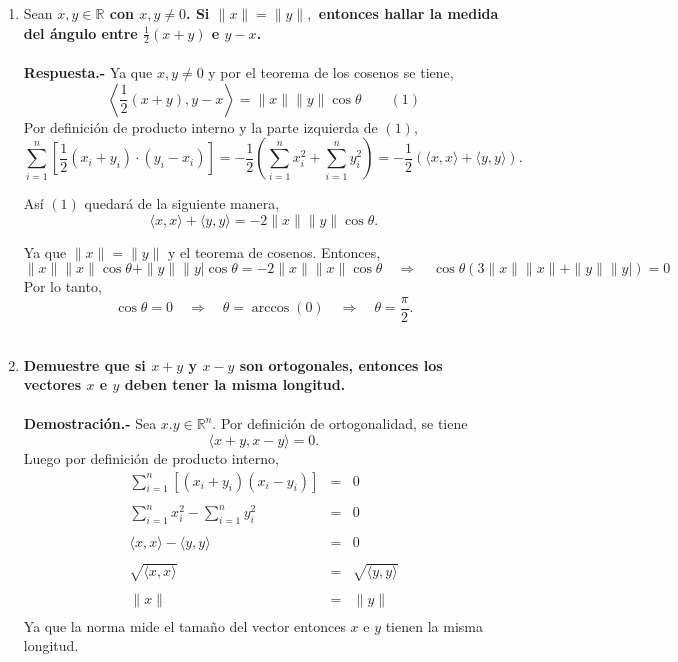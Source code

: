 \begin{enumerate}

    \item Sean \textbf{\boldmath $x,y \in \mathbb{R}$ con $x,y\neq 0$. Si $\|x\|=\|y\|,$ entonces hallar la medida del ángulo entre $\frac{1}{2}(x+y)$ e $y-x$.\\\\
	Respuesta.-}\; Ya que $x,y\neq 0$ y por el teorema de los cosenos se tiene,
	$$\left\langle \frac{1}{2}(x+y),y-x \right\rangle = \|x\|\|y\|\cos \theta \qquad (1)$$
	Por definición de producto interno y la parte izquierda de $(1)$,
	$$\sum_{i=1}^n \left[\dfrac{1}{2}(x_i+y_i)\cdot (y_i-x_i) \right]= -\dfrac{1}{2}\left(\sum_{i=1}^n x_i^2+\sum_{i=1}^n y_i^2\right) = -\dfrac{1}{2}\left(\langle x,x\rangle + \langle y,y\rangle \right).$$

	Así $(1)$ quedará de la siguiente manera,
	$$\langle x,x\rangle + \langle y,y\rangle = -2\|x\|\|y\|\cos \theta.$$

	Ya que $\|x\|=\|y\|$ y el teorema de cosenos. Entonces,
	$$\|x\|\|x\|\cos \theta + \|y\|\|y|\cos \theta = -2\|x\|\|x\|\cos \theta \quad \Rightarrow \quad \cos \theta \left(3\|x\|\|x\|+\|y\|\|y|\right)=0$$
	Por lo tanto,
	$$\cos \theta = 0 \quad \Rightarrow \quad \theta = \arccos(0) \quad \Rightarrow \quad \theta = \dfrac{\pi}{2}.$$\\
	

    \item \textbf{\boldmath Demuestre que si $x+y$ y $x-y$ son ortogonales, entonces los vectores $x$ e $y$ deben tener la misma longitud.\\\\
	Demostración.-}\; Sea $x.y\in \mathbb{R}^n$. Por definición de ortogonalidad, se tiene
	$$\langle x+y,x-y \rangle=0.$$
	Luego por definición de producto interno,
	$$\begin{array}{rcl}
	    \displaystyle\sum_{i=1}^n \left[(x_i+y_i)(x_i-y_i) \right]&=&0\\\\
	    \displaystyle\sum_{i=1}^n x_i^2 - \displaystyle\sum_{i=1}^n y_i^2&=&0\\\\
	    \langle x,x\rangle - \langle y,y\rangle &=&0\\\\
	    \sqrt{\langle x,x\rangle}&=&\sqrt{\langle y,y\rangle}\\\\
				     \|x\|&=&\|y\|\\
	\end{array}$$
	Ya que la norma mide el tamaño del vector entonces $x$ e $y$  tienen la misma longitud.\\\\



\end{enumerate}
